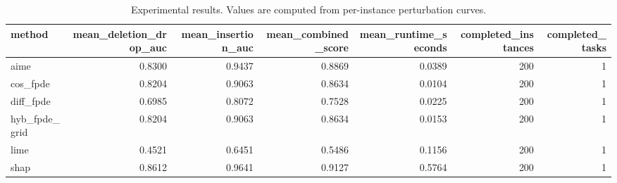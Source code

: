 \begin{table}[t]
\caption{Experimental results. Values are computed from per-instance perturbation curves.}
\label{tab:main_results_computed}
\centering
\begin{tabular}{lrrrrrr}
\toprule
method & mean\_deletion\_drop\_auc & mean\_insertion\_auc & mean\_combined\_score & mean\_runtime\_seconds & completed\_instances & completed\_tasks \\
\midrule
aime & 0.8300 & 0.9437 & 0.8869 & 0.0389 & 200 & 1 \\
cos\_fpde & 0.8204 & 0.9063 & 0.8634 & 0.0104 & 200 & 1 \\
diff\_fpde & 0.6985 & 0.8072 & 0.7528 & 0.0225 & 200 & 1 \\
hyb\_fpde\_grid & 0.8204 & 0.9063 & 0.8634 & 0.0153 & 200 & 1 \\
lime & 0.4521 & 0.6451 & 0.5486 & 0.1156 & 200 & 1 \\
shap & 0.8612 & 0.9641 & 0.9127 & 0.5764 & 200 & 1 \\
\bottomrule
\end{tabular}

\end{table}
